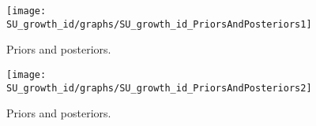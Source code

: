  
\begin{figure}[H]
\centering
\texttt{[image: SU\_growth\_id/graphs/SU\_growth\_id\_PriorsAndPosteriors1]}
\caption{Priors and posteriors.}\label{Fig:PriorsAndPosteriors:1}
\end{figure}
 
\begin{figure}[H]
\centering
\texttt{[image: SU\_growth\_id/graphs/SU\_growth\_id\_PriorsAndPosteriors2]}
\caption{Priors and posteriors.}\label{Fig:PriorsAndPosteriors:2}
\end{figure}
 
